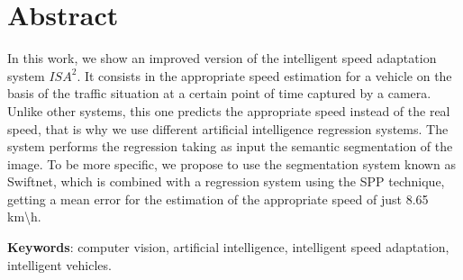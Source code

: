 \chapter{Abstract}
In this work, we show an improved version of the intelligent speed adaptation system  $ISA^{2}$. It consists in the appropriate speed estimation for a vehicle on the basis of the traffic situation at a certain point of time captured by a camera. Unlike other systems, this one predicts the appropriate speed instead of the real speed, that is why we use different artificial intelligence regression systems. The system performs the regression taking as input the semantic segmentation of the image. To be more specific, we propose to use the segmentation system known as Swiftnet, which is combined with a regression system using the \ac{SPP} technique, getting a mean error for the estimation of the appropriate speed of just 8.65 km\textbackslash{h}.

\vspace{0.5cm}

\textbf{Keywords}: computer vision, artificial intelligence, intelligent speed adaptation, intelligent vehicles.
\newpage
\thispagestyle{empty}
\hspace*{0.5cm}
\newpage
